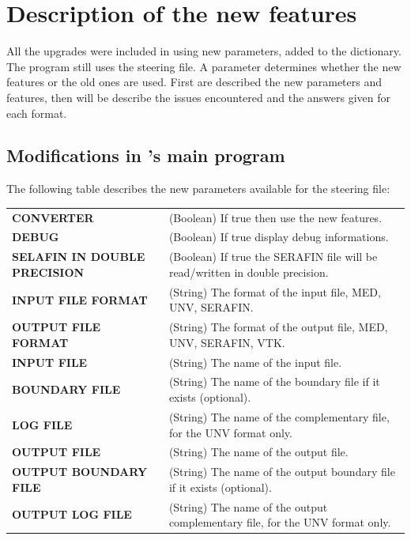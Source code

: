 \section{\label{upgrades}Description of the new features}

All the upgrades were included in \stbtel using new parameters, added to the
dictionary. The program still uses the steering file. A parameter determines
whether the new features or the old ones are used.  First are described the new
parameters and features, then will be describe the issues encountered and the
answers given for each format.

\subsection{Modifications in \stbtel's main program}

The following table describes the new parameters available for the steering
file:\\

\begin{tabular}{p{140pt}@{ : }p{200pt}}
\textbf{CONVERTER} & (Boolean) If true then use the new features.\\
\textbf{DEBUG} & (Boolean) If true display debug informations.\\
\textbf{SELAFIN IN DOUBLE PRECISION} & (Boolean) If true the SERAFIN file will be read/written in double precision.\\
\textbf{INPUT FILE FORMAT} & (String) The format of the input file, MED, UNV, SERAFIN.\\
\textbf{OUTPUT FILE FORMAT} & (String) The format of the output file, MED, UNV, SERAFIN, VTK.\\
\textbf{INPUT FILE} & (String) The name of the input file.\\
\textbf{BOUNDARY FILE} & (String) The name of the boundary file if it exists (optional).\\
\textbf{LOG FILE} & (String) The name of the complementary file, for the UNV format only.\\
\textbf{OUTPUT FILE} & (String) The name of the output file.\\
\textbf{OUTPUT BOUNDARY FILE} & (String) The name of the output boundary file if it exists (optional).\\
\textbf{OUTPUT LOG FILE} & (String) The name of the output complementary file, for the UNV format only.\\
\end{tabular}

